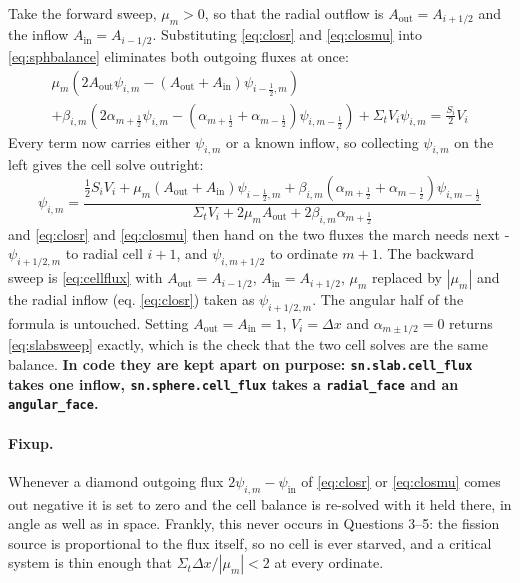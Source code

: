 \documentclass[11pt]{article}
\begin{document}
Take the forward sweep, $\mu_m>0$, so that the radial outflow is
$A_{\text{out}}=A_{i+1/2}$ and the inflow $A_{\text{in}}=A_{i-1/2}$. Substituting
\eqref{eq:closr} and \eqref{eq:closmu} into \eqref{eq:sphbalance} eliminates both outgoing
fluxes at once:
\begin{multline}
    \mu_m\left(2A_{\text{out}}\psi_{i,m} - \left(A_{\text{out}}+A_{\text{in}}\right)\psi_{i-\frac12,m}\right) \\
    + \beta_{i,m}\left(2\alpha_{m+\frac12}\psi_{i,m} - \left(\alpha_{m+\frac12}+\alpha_{m-\frac12}\right)\psi_{i,m-\frac12}\right)
    + \Sigma_t V_i \psi_{i,m} = \frac{S_i}{2}V_i
    \label{eq:sphcollect}
\end{multline}
Every term now carries either $\psi_{i,m}$ or a known inflow, so collecting
$\psi_{i,m}$ on the left gives the cell solve outright:
\begin{equation}
    \boxed{\;
    \psi_{i,m} = \frac{\tfrac12 S_i V_i
        + \mu_m\left(A_{\text{out}}+A_{\text{in}}\right)\psi_{i-\frac12,m}
        + \beta_{i,m}\left(\alpha_{m+\frac12}+\alpha_{m-\frac12}\right)\psi_{i,m-\frac12}}
        {\Sigma_t V_i + 2\mu_m A_{\text{out}} + 2\beta_{i,m}\alpha_{m+\frac12}}\;}
    \label{eq:cellflux}
\end{equation}
and \eqref{eq:closr} and \eqref{eq:closmu} then hand on the two fluxes the
march needs next - $\psi_{i+1/2,m}$ to radial cell $i+1$, and $\psi_{i,m+1/2}$ to ordinate
$m+1$. The backward sweep is \eqref{eq:cellflux} with $A_{\text{out}}=A_{i-1/2}$,
$A_{\text{in}}=A_{i+1/2}$, $\mu_m$ replaced by $|\mu_m|$ and the radial inflow (eq. \eqref{eq:closr}) taken as
$\psi_{i+1/2,m}$. The angular half of the formula is untouched. Setting
$A_{\text{out}}=A_{\text{in}}=1$, $V_i=\Delta x$ and $\alpha_{m\pm1/2}=0$ returns
\eqref{eq:slabsweep} exactly, which is the check that the two cell solves are the same
balance. \textbf{In code they are kept apart on purpose: \texttt{sn.slab.cell\_flux} takes one
inflow, \texttt{sn.sphere.cell\_flux} takes a \texttt{radial\_face} and an
\texttt{angular\_face}.}


\paragraph{Fixup.} Whenever a diamond outgoing flux $2\psi_{i,m}-\psi_{\text{in}}$ of \eqref{eq:closr} or \eqref{eq:closmu} comes out negative it is set to zero and the cell balance is re-solved with it held there, in angle as well as in space. Frankly, this never occurs in Questions 3--5: the fission source is proportional to the flux itself, so no cell is ever starved, and a critical system is thin enough that $\Sigma_t \Delta x / |\mu_m| < 2$ at every ordinate.
\end{document}

